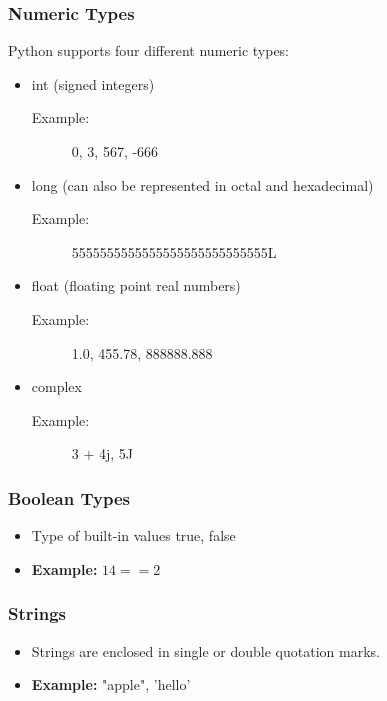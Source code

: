 \documentclass[14pt]{beamer}
\begin{document}
    \begin{frame}
        \frametitle{Numeric Types}
        Python supports four different numeric types:
        \begin{itemize}
            \item int (signed integers)
                \begin{description}
                    \item [Example:]  0, 3, 567, -666
                \end{description}
            \item long (can also be represented in octal and hexadecimal)
                \begin{description}
                    \item [Example:] 5555555555555555555555555555L
                \end{description}
            \item float (floating point real numbers)
                \begin{description}
                    \item [Example:] 1.0, 455.78, 888888.888
                \end{description}
            \item complex
                \begin{description}
                    \item [Example:] 3 + 4j, 5J
                \end{description}
        \end{itemize}
    \end{frame}
    \begin{frame}
        \frametitle{Boolean Types}
        \begin{itemize}
            \item Type of built-in values true, false
            \item \textbf{Example: } $14 == 2$
        \end{itemize}
    \end{frame}
    \begin{frame}
        \frametitle{Strings}
        \begin{itemize}
            \item Strings are enclosed in single or double quotation marks.
            \item \textbf{Example:}  "apple", 'hello'
        \end{itemize}
    \end{frame}
\end{document}
